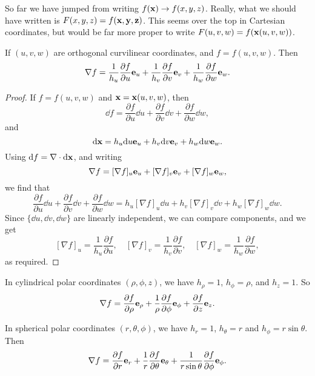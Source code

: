 \documentclass[a4paper]{scrreprt}
\begin{document}
\begin{remark}
	So far we have jumped from writing $f(\mathbf{x}) \rightarrow f(x, y, z)$. Really, what we should have written is $F(x, y, z) = f(\mathbf{x, y, z})$. This seems over the top in Cartesian coordinates, but would be far more proper to write $F(u, v, w) = f(\mathbf{x}(u, v, w))$.
\end{remark}

\begin{proposition}
	If $(u, v, w)$ are orthogonal curvilinear coordinates, and $f = f(u, v, w)$. Then
	$$
	\nabla f = \frac{1}{h_u} \frac{\partial f}{\partial u} \mathbf{e}_u + \frac{1}{h_v} \frac{\partial f}{\partial v} \mathbf{e}_v + \frac{1}{h_w} \frac{\partial f}{\partial w} \mathbf{e}_w.
	$$
\end{proposition}
\begin{proof}
	If $f = f(u, v, w)$ and $\mathbf{x} = \mathbf{x}(u, v, w)$, then
	$$
\dd f = \frac{\partial f}{\partial u} \dd u + \frac{\partial f}{\partial v} \dd v + \frac{\partial f}{\partial w} \dd w,
	$$
	and
	$$
	\mathrm{d} \mathbf{x} = h_u \mathrm{d} u \mathbf{e}_u + h_v \mathrm{d} v \mathbf{e}_v + h_w \mathrm{d} w \mathbf{e}_w.
	$$
	Using $\mathrm{d} f = \nabla \cdot \mathrm{d} \mathbf{x}$,  and writing
	$$
	\nabla f = [\nabla f]_u \mathbf{e}_u + [\nabla f]_v \mathbf{e}_v + [\nabla f]_w \mathbf{e}_w,
	$$
	we find that
	$$
	\frac{\partial f}{\partial u} \dd u + \frac{\partial f}{\partial v} \dd v + \frac{\partial f}{\partial w} \dd w = h_u [\nabla f]_u \dd u + h_v [\nabla f]_v \dd v + h_w [\nabla f]_w \dd w.
	$$
	Since $\{\dd u, \dd v, \dd w\}$ are linearly independent, we can compare components, and we get 
	$$
	[\nabla f]_u = \frac{1}{h_u} \frac{\partial f}{\partial u},
	 \quad [\nabla f]_v = \frac{1}{h_v} \frac{\partial f}{\partial v}, 
	\quad [\nabla f]_w = \frac{1}{h_w} \frac{\partial f}{\partial w},
	$$
	as required.
\end{proof}

\begin{example}
	In cylindrical polar coordinates $(\rho, \phi, z)$, we have $h_\rho = 1$, $h_\phi = \rho$, and $h_z = 1$. So
	$$
	\nabla f = \frac{\partial f}{\partial \rho} \mathbf{e}_\rho + \frac{1}{\rho}\frac{\partial f}{\partial \phi} \mathbf{e}_\phi + \frac{\partial f}{\partial z} \mathbf{e}_z.
	$$

	In spherical polar coordinates $(r, \theta, \phi)$, we have $h_r = 1$, $h_\theta = r$ and $h_\phi = r \sin \theta$. Then
	$$
\nabla f = \frac{\partial f}{\partial r} \mathbf{e}_r + \frac{1}{r} \frac{\partial f}{\partial \theta} \mathbf{e}_\theta + \frac{1}{ r \sin \theta} \frac{\partial f}{\partial \phi} \mathbf{e}_\phi.
	$$
\end{example}
\end{document}
